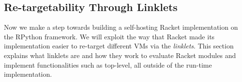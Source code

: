 \subsection{Re-targetability Through Linklets}
\label{subsec:linklets}

Now we make a step towards building a self-hosting Racket
implementation on the RPython framework. We will exploit the way that
Racket made its implementation easier to re-target different VMs via
the \emph{linklets}. This section explains what linklets are and how
they work to evaluate Racket modules and implement functionalities
such as top-level, all outside of the run-time implementation.




